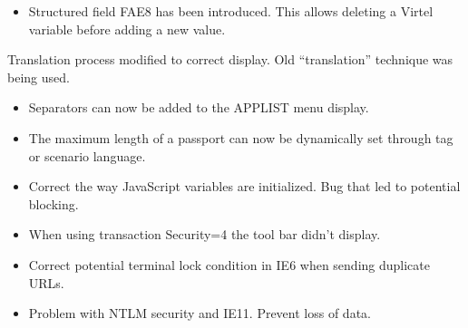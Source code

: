 \documentclass[letterpaper,10pt,english]{sphinxmanual}
\begin{document}
\begin{itemize}
\item {} 
Structured field FAE8 has been introduced. This allows deleting a Virtel variable before adding a new value.

\end{itemize}


Translation process modified to correct display. Old “translation” technique was being used.

\begin{itemize}
\item {} 
Separators can now be added to the APPLIST menu display.

\end{itemize}

\begin{itemize}
\item {} 
The maximum length of a passport can now be dynamically set through tag or scenario language.

\end{itemize}

\begin{itemize}
\item {} 
Correct the way JavaScript variables are initialized. Bug that led to potential blocking.

\end{itemize}

\begin{itemize}
\item {} 
When using transaction Security=4 the tool bar didn’t display.

\end{itemize}

\begin{itemize}
\item {} 
Correct potential terminal lock condition in IE6 when sending duplicate URLs.

\end{itemize}

\begin{itemize}
\item {} 
Problem with NTLM security and IE11. Prevent loss of data.

\end{itemize}
\end{document}
